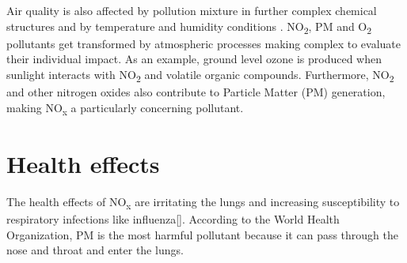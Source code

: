 Air quality is also affected by pollution mixture in further complex chemical structures and by temperature and humidity conditions . NO\textsubscript{2}, PM and O\textsubscript{2}  pollutants get transformed by atmospheric processes making complex to evaluate their individual impact. As an example, ground level ozone is produced when sunlight interacts with NO\textsubscript{2} and volatile organic compounds. Furthermore, NO\textsubscript{2} and other nitrogen oxides also contribute to Particle Matter (PM) generation, making NO\textsubscript{x} a particularly concerning pollutant.

\section{Health effects}

 The health effects of NO\textsubscript{x} are irritating the lungs and increasing susceptibility to respiratory infections like influenza[].
 According to the World Health Organization, PM is the most harmful pollutant because it can pass through the nose and throat and enter the lungs. 
 
